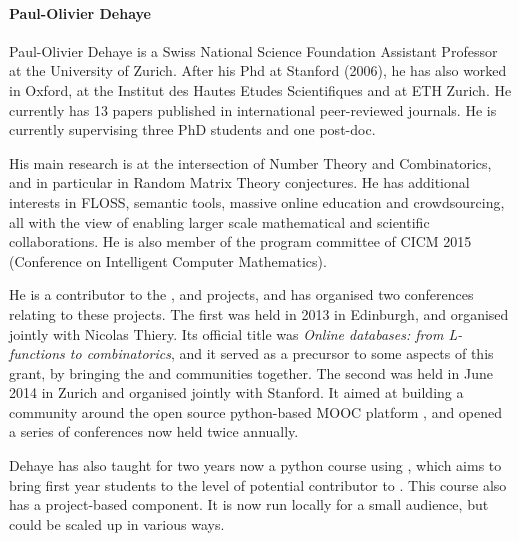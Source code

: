 \paragraph{Paul-Olivier Dehaye}

% 
%

%


Paul-Olivier Dehaye is a Swiss National Science Foundation Assistant Professor 
at the University of Zurich. After his Phd at Stanford (2006), he has also worked in Oxford, 
at the Institut des Hautes Etudes Scientifiques and at ETH Zurich. He currently has 13 
papers published in international peer-reviewed journals. He is currently supervising three PhD students and one post-doc.

His main research is at the intersection of Number Theory and Combinatorics, and in 
particular in Random Matrix Theory conjectures. He has additional interests in FLOSS, 
semantic tools, massive online education and crowdsourcing, all with the view of 
enabling larger scale mathematical and scientific collaborations. He is also member of the program committee of CICM 2015 (Conference on Intelligent Computer Mathematics).

He is a contributor to the \Sage, \LMFDB and \OpenEdX projects, and has organised two 
conferences relating to these projects. The first was held in 2013 in Edinburgh, and organised
jointly with Nicolas Thiery. Its official title was  \emph{Online databases: from L-functions to combinatorics}, 
and it served as a precursor to some aspects of this grant, by bringing the \SageCombinat and \LMFDB communities together. 
The second was held in June 2014 in Zurich and organised jointly with Stanford. It aimed at building a community around the open 
source python-based MOOC platform \OpenEdX, and opened a series of conferences now held twice annually. 

Dehaye has also taught for two years now a python course using \OpenEdX, which aims to bring 
first year students to the level of potential contributor to \Sage. This course also has a 
project-based component. It is now run locally for a small audience, but could be scaled up 
in various ways. 

